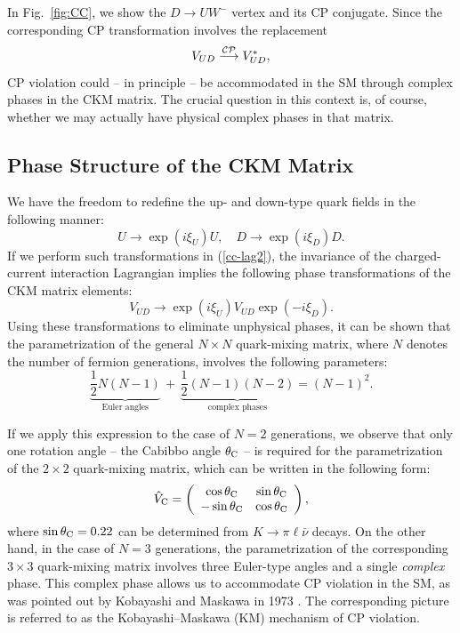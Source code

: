 \documentclass[12pt]{article}
\begin{document}
In Fig.~\ref{fig:CC}, we show the $D\to U W^-$ vertex and its CP 
conjugate. Since the corresponding CP transformation involves the 
replacement
\begin{equation}\label{CKM-CP}
V_{UD}\stackrel{{\cal CP}}{\longrightarrow}V_{UD}^\ast,
\end{equation}
CP violation could -- in principle -- be accommodated in the SM through 
complex phases in the CKM matrix. The crucial question in this context
is, of course, whether we may actually have physical complex phases in 
that matrix.


%
%
%
\subsection{Phase Structure of the CKM Matrix}
%
%
%
We have the freedom to redefine the up- and down-type quark fields
in the following manner:
\begin{equation}
U\to \exp(i\xi_U)U,\quad D\to \exp(i\xi_D)D. 
\end{equation}
If we perform such transformations in (\ref{cc-lag2}), the invariance 
of the charged-current interaction Lagrangian implies the 
following phase transformations of the CKM matrix elements:
\begin{equation}\label{CKM-trafo}
V_{UD}\to\exp(i\xi_U)V_{UD}\exp(-i\xi_D).
\end{equation}
Using these transformations to eliminate unphysical phases, it can be shown 
that the parametrization of the general $N\times N$ quark-mixing matrix, 
where $N$ denotes the number of fermion generations, involves the following 
parameters:
\begin{equation}
\underbrace{\frac{1}{2}N(N-1)}_{\mbox{Euler angles}} \, + \,
\underbrace{\frac{1}{2}(N-1)(N-2)}_{\mbox{complex phases}}=
(N-1)^2.
\end{equation}

If we apply this expression to the case of $N=2$ generations, we observe
that only one rotation angle -- the Cabibbo angle $\theta_{\rm C}$
\cite{cab} -- is required for the parametrization of the $2\times2$
quark-mixing matrix, which can be written in the following form:
\begin{equation}\label{Cmatrix}
\hat V_{\rm C}=\left(\begin{array}{cc}
\cos\theta_{\rm C}&\sin\theta_{\rm C}\\
-\sin\theta_{\rm C}&\cos\theta_{\rm C}
\end{array}\right),
\end{equation}
where $\sin\theta_{\rm C}=0.22$ can be determined from $K\to\pi\ell\bar\nu$ 
decays. On the other hand, in the case of $N=3$ generations, the 
parametrization of the corresponding $3\times3$ quark-mixing matrix involves 
three Euler-type angles and a single {\it complex} phase. This complex phase 
allows us to accommodate CP violation in the SM, as was pointed out by 
Kobayashi and Maskawa in 1973 \cite{KM}. The corresponding picture
is referred to as the Kobayashi--Maskawa (KM) mechanism of CP violation.
\end{document}
